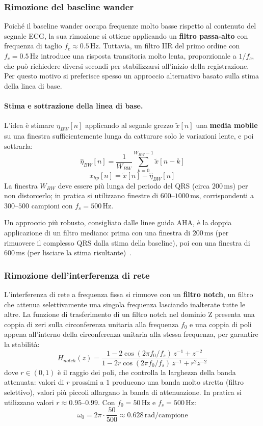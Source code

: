 \subsubsection{Rimozione del baseline wander}
Poiché il baseline wander occupa frequenze molto basse rispetto al contenuto del segnale ECG, la sua rimozione si ottiene applicando un \textbf{filtro passa-alto} con frequenza di taglio $f_c \approx 0.5\,\text{Hz}$. Tuttavia, un filtro IIR del primo ordine con $f_c = 0.5\,\text{Hz}$ introduce una risposta transitoria molto lenta, proporzionale a $1/f_c$, che può richiedere diversi secondi per stabilizzarsi all'inizio della registrazione. Per questo motivo si preferisce spesso un approccio alternativo basato sulla stima della linea di base.

\paragraph{Stima e sottrazione della linea di base.}
L'idea è stimare $\eta_{BW}[n]$ applicando al segnale grezzo $\tilde{x}[n]$ una \textbf{media mobile} su una finestra sufficientemente lunga da catturare solo le variazioni lente, e poi sottrarla:
\[
\hat{\eta}_{BW}[n] = \frac{1}{W_{BW}} \sum_{k=0}^{W_{BW}-1}
\tilde{x}[n-k]
\]
\[
x_{hp}[n] = \tilde{x}[n] - \hat{\eta}_{BW}[n]
\]
La finestra $W_{BW}$ deve essere più lunga del periodo del QRS (circa $200\,\text{ms}$) per non distorcerlo; in pratica si utilizzano finestre di $600$--$1000\,\text{ms}$, corrispondenti a $300$--$500$ campioni con $f_s = 500\,\text{Hz}$.

Un approccio più robusto, consigliato dalle linee guida AHA, è la doppia applicazione di un filtro mediano: prima con una finestra di $200\,\text{ms}$ (per rimuovere il complesso QRS dalla stima della baseline), poi con una finestra di $600\,\text{ms}$ (per lisciare la stima risultante)~\cite{sornmo2005bioelectrical}.

\subsubsection{Rimozione dell'interferenza di rete}
L'interferenza di rete a frequenza fissa si rimuove con un \textbf{filtro notch}, un filtro che attenua selettivamente una singola frequenza lasciando inalterate tutte le altre. La funzione di trasferimento di un filtro notch nel dominio Z presenta una coppia di zeri sulla circonferenza unitaria alla frequenza $f_0$ e una coppia di poli appena all'interno della circonferenza unitaria alla stessa frequenza, per garantire la stabilità:
\[
H_{notch}(z) = \frac{1 - 2\cos(2\pi f_0/f_s)\, z^{-1} + z^{-2}}
{1 - 2r\cos(2\pi f_0/f_s)\, z^{-1} +
	r^2 z^{-2}}
\]
dove $r \in (0,1)$ è il raggio dei poli, che controlla la larghezza della banda attenuata: valori di $r$ prossimi a $1$ producono una banda molto stretta (filtro selettivo), valori più piccoli allargano la banda di attenuazione. In pratica si utilizzano valori $r \approx 0.95$--$0.99$. Con $f_0 = 50\,\text{Hz}$ e $f_s = 500\,\text{Hz}$:
\[
\omega_0 = 2\pi \cdot \frac{50}{500} \approx
0.628\,\text{rad/campione}
\]

